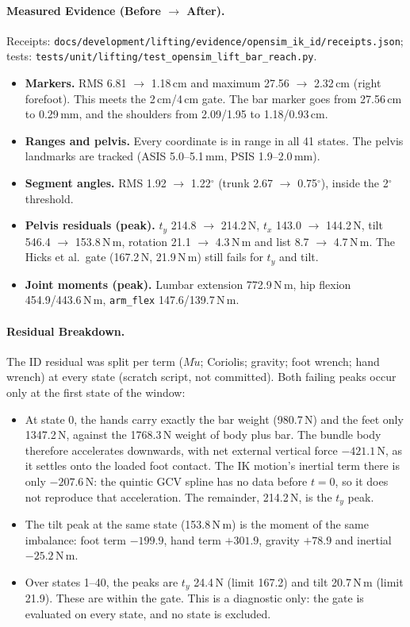 \documentclass[11pt,a4paper]{article}
\begin{document}
\paragraph{Measured Evidence (Before $\rightarrow$ After).} Receipts:
\texttt{docs/development/lifting/evidence/opensim\_ik\_id/receipts.json};
tests: \texttt{tests/unit/lifting/test\_opensim\_lift\_bar\_reach.py}.
\begin{itemize}[nosep]
\item \textbf{Markers.} RMS 6.81 $\rightarrow$ 1.18\,cm and maximum 27.56
  $\rightarrow$ 2.32\,cm (right forefoot). This meets the 2\,cm/4\,cm gate.
  The bar marker goes from 27.56\,cm to 0.29\,mm, and the shoulders from
  2.09/1.95 to 1.18/0.93\,cm.
\item \textbf{Ranges and pelvis.} Every coordinate is in range in all 41
  states. The pelvis landmarks are tracked (ASIS 5.0--5.1\,mm, PSIS
  1.9--2.0\,mm).
\item \textbf{Segment angles.} RMS 1.92 $\rightarrow$ 1.22$^\circ$ (trunk
  2.67 $\rightarrow$ 0.75$^\circ$), inside the 2$^\circ$ threshold.
\item \textbf{Pelvis residuals (peak).} $t_y$ 214.8 $\rightarrow$ 214.2\,N,
  $t_x$ 143.0 $\rightarrow$ 144.2\,N, tilt 546.4 $\rightarrow$ 153.8\,N\,m,
  rotation 21.1 $\rightarrow$ 4.3\,N\,m and list 8.7 $\rightarrow$
  4.7\,N\,m. The Hicks et al.\ gate (167.2\,N, 21.9\,N\,m) still fails for
  $t_y$ and tilt.
\item \textbf{Joint moments (peak).} Lumbar extension 772.9\,N\,m, hip
  flexion 454.9/443.6\,N\,m, \texttt{arm\_flex} 147.6/139.7\,N\,m.
\end{itemize}

\paragraph{Residual Breakdown.} The ID residual was split per term
($M\dot u$; Coriolis; gravity; foot wrench; hand wrench) at every state
(scratch script, not committed). Both failing peaks occur only at the first
state of the window:
\begin{itemize}[nosep]
\item At state 0, the hands carry exactly the bar weight (980.7\,N) and the
  feet only 1347.2\,N, against the 1768.3\,N weight of body plus bar. The
  bundle body therefore accelerates downwards, with net external vertical
  force $-421.1$\,N, as it settles onto the loaded foot contact. The IK
  motion's inertial term there is only $-207.6$\,N: the quintic GCV spline
  has no data before $t=0$, so it does not reproduce that acceleration.
  The remainder, 214.2\,N, is the $t_y$ peak.
\item The tilt peak at the same state (153.8\,N\,m) is the moment of the
  same imbalance: foot term $-199.9$, hand term $+301.9$, gravity $+78.9$
  and inertial $-25.2$\,N\,m.
\item Over states 1--40, the peaks are $t_y$ 24.4\,N (limit 167.2) and
  tilt 20.7\,N\,m (limit 21.9). These are within the gate.
  This is a diagnostic only: the gate is evaluated on every state, and no
  state is excluded.
\end{itemize}
\end{document}
